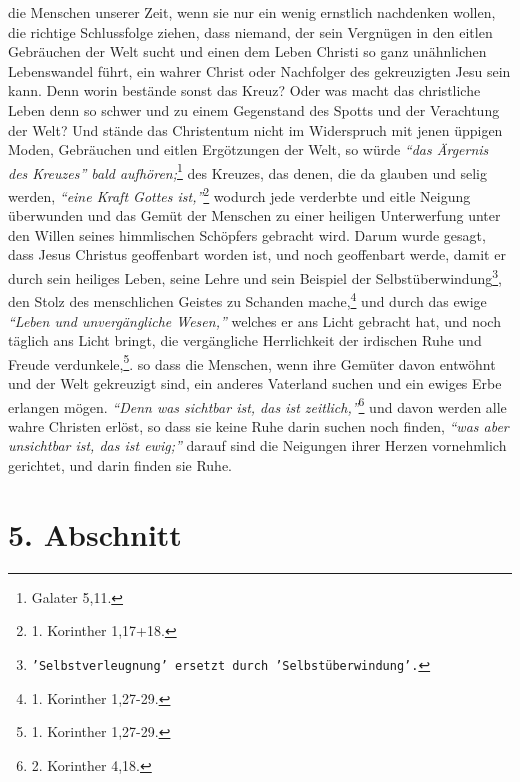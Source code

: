 die Menschen unserer Zeit, wenn sie nur ein wenig ernstlich nachdenken wollen,
die richtige Schlussfolge ziehen, dass niemand, der sein Vergnügen in den eitlen
Gebräuchen der Welt sucht und einen dem Leben Christi so ganz unähnlichen
Lebenswandel führt, ein wahrer Christ oder Nachfolger des gekreuzigten Jesu sein
kann. Denn worin bestände sonst das Kreuz? Oder was macht das christliche
Leben denn so schwer und zu einem Gegenstand des Spotts und der Verachtung der
Welt? Und stände das Christentum nicht im Widerspruch mit jenen üppigen Moden,
Gebräuchen und eitlen Ergötzungen der Welt, so würde
\textit{"`das Ärgernis des Kreuzes"' bald aufhören;}\footnote{Galater 5,11.}
des Kreuzes, das denen, die da glauben und
selig werden,
\textit{"`eine Kraft Gottes ist,"'}\footnote{1. Korinther 1,17+18.}
wodurch jede
verderbte und eitle Neigung überwunden und das Gemüt der Menschen zu einer
heiligen Unterwerfung unter den Willen seines himmlischen Schöpfers gebracht
wird. Darum wurde gesagt, dass Jesus Christus geoffenbart worden ist, und noch
geoffenbart werde, damit er durch sein heiliges Leben, seine Lehre und sein
Beispiel der Selbstüberwindung\footnote{\texttt{'Selbstverleugnung' ersetzt
durch 'Selbstüberwindung'.}}, den Stolz des menschlichen Geistes zu Schanden
mache,\footnote{1. Korinther 1,27-29.}
und durch das ewige \textit{"`Leben und unvergängliche
Wesen,"'} welches er ans Licht gebracht hat, und noch täglich ans
Licht bringt,
die vergängliche Herrlichkeit der irdischen Ruhe und Freude
verdunkele,\footnote{1. Korinther 1,27-29.}.
so dass die Menschen, wenn ihre
Gemüter davon entwöhnt und der Welt gekreuzigt sind, ein anderes Vaterland
suchen und ein ewiges Erbe erlangen mögen.
\textit{"`Denn was sichtbar ist, das ist zeitlich,"'}\footnote{2. Korinther
4,18.}
und davon werden alle wahre Christen erlöst,
so dass sie keine Ruhe darin suchen noch finden,
\textit{"`was aber unsichtbar ist, das
ist ewig;"'} darauf sind die Neigungen ihrer Herzen vornehmlich gerichtet, und
darin finden sie Ruhe.

\section{5. Abschnitt} \label{kap16_ab5}


